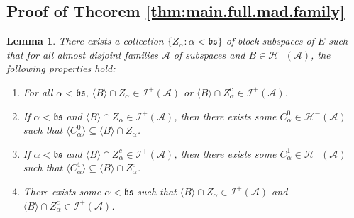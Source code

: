 \documentclass[10pt,a4paper]{amsart}
\theoremstyle{plain}
\numberwithin{equation}{section}
\newtheorem{lemma}[theorem]{Lemma}
\theoremstyle{definition}
\renewcommand{\c}[1]{\langle #1 \rangle}
\newcommand{\cal}{\mathcal}
\renewcommand{\frak}{\mathfrak}
\newcommand{\A}{\cal{A}}
\renewcommand{\H}{\cal{H}}
\newcommand{\I}{\cal{I}}
\begin{document}
\subsection{Proof of Theorem \ref{thm:main.full.mad.family}}
\begin{lemma}
\label{lem:splitting.lemma}
    There exists a collection $\{Z_\alpha : \alpha < \frak{bs}\}$ of block subspaces of $E$ such that for all almost disjoint families $\A$ of subspaces and $B \in \H^-(\A)$, the following properties hold:
    \begin{enumerate}[label=(\roman*)]
        \item For all $\alpha < \frak{bs}$, $\c{B} \cap Z_\alpha \in \I^+(\A)$ or $\c{B} \cap Z_\alpha^c \in \I^+(\A)$.
    
        \item If $\alpha < \frak{bs}$ and $\c{B} \cap Z_\alpha \in \I^+(\A)$, then there exists some $C_\alpha^0 \in \H^-(\A)$ such that $\c{C_\alpha^0} \subseteq \c{B} \cap Z_\alpha$.

        \item If $\alpha < \frak{bs}$ and $\c{B} \cap Z_\alpha^c \in \I^+(\A)$, then there exists some $C_\alpha^1 \in \H^-(\A)$ such that $\c{C_\alpha^1} \subseteq \c{B} \cap Z_\alpha^c$.

        \item There exists some $\alpha < \frak{bs}$ such that $\c{B} \cap Z_\alpha \in \I^+(\A)$ and $\c{B} \cap Z_\alpha^c \in \I^+(\A)$.
    \end{enumerate}
\end{lemma}
\end{document}

